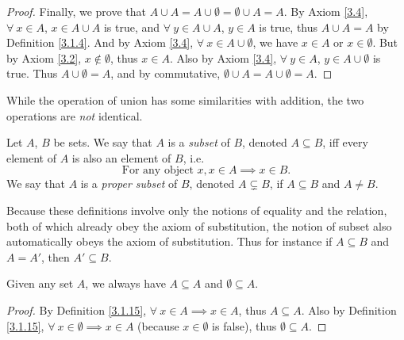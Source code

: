 \begin{proof}
Finally, we prove that \(A \cup A = A \cup \emptyset = \emptyset \cup A = A\).
By Axiom \ref{3.4}, \(\forall\ x \in A\), \(x \in A \cup A\) is true, and \(\forall\ y \in A \cup A\), \(y \in A\) is true, thus \(A \cup A = A\) by Definition \ref{3.1.4}.
And by Axiom \ref{3.4}, \(\forall\ x \in A \cup \emptyset\), we have \(x \in A\) or \(x \in \emptyset\).
But by Axiom \ref{3.2}, \(x \notin \emptyset\), thus \(x \in A\).
Also by Axiom \ref{3.4}, \(\forall\ y \in A\), \(y \in A \cup \emptyset\) is true.
Thus \(A \cup \emptyset = A\), and by commutative, \(\emptyset \cup A = A \cup \emptyset = A\).
\end{proof}

\begin{remark}\label{3.1.14}
While the operation of union has some similarities with addition, the two operations are \emph{not} identical.
\end{remark}

\begin{definition}[Subsets]\label{3.1.15}
Let \(A\), \(B\) be sets.
We say that \(A\) is a \emph{subset} of \(B\), denoted \(A \subseteq B\), iff every element of \(A\) is also an element of \(B\), i.e.
\[
    \text{For any object } x, x \in A \implies x \in B.
\]
We say that \(A\) is a \emph{proper subset} of \(B\), denoted \(A \subsetneq B\), if \(A \subseteq B\) and \(A \neq B\).
\end{definition}

\begin{remark}\label{3.1.16}
Because these definitions involve only the notions of equality and the  relation, both of which already obey the axiom of substitution, the notion of subset also automatically obeys the axiom of substitution.
Thus for instance if \(A \subseteq B\) and \(A = A'\), then \(A' \subseteq B\).
\end{remark}

\begin{corollary}\label{3.1.17}
Given any set \(A\), we always have \(A \subseteq A\) and \(\emptyset \subseteq A\).
\end{corollary}

\begin{proof}
By Definition \ref{3.1.15}, \(\forall\ x \in A \implies x \in A\), thus \(A \subseteq A\).
Also by Definition \ref{3.1.15}, \(\forall\ x \in \emptyset \implies x \in A\) (because \(x \in \emptyset\) is false), thus \(\emptyset \subseteq A\).
\end{proof}

